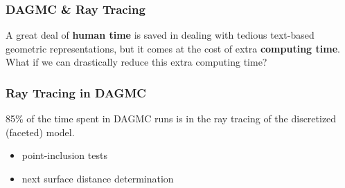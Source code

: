 \documentclass[12pt]{beamer}
\begin{document}

  









\begin{frame}

  \frametitle{DAGMC \& Ray Tracing}
  
  A great deal of \textbf{human time} is saved in dealing with tedious text-based geometric representations, but it comes at the cost of extra \textbf{computing time}.
 \vfill
 What if we can drastically reduce this extra computing time?

 \vfill

  
\end{frame}

\begin{frame}

\frametitle{Ray Tracing in DAGMC}
 85\% of the time spent in DAGMC runs is in the ray tracing of the discretized (faceted) model.

\begin{itemize}
\item point-inclusion tests
\item next surface distance determination
\end{itemize}



\end{frame}
\end{document}
